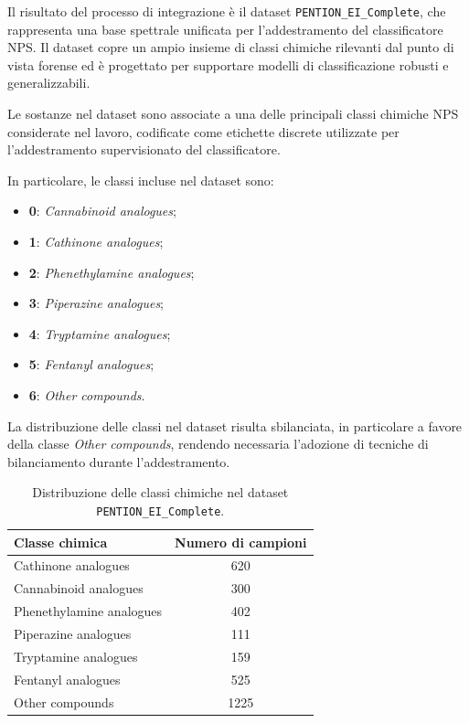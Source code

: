Il risultato del processo di integrazione è il dataset \texttt{PENTION\_EI\_Complete}, che rappresenta una base spettrale unificata per l’addestramento del classificatore NPS.
Il dataset copre un ampio insieme di classi chimiche rilevanti dal punto di vista forense ed è progettato per supportare modelli di classificazione robusti e generalizzabili.

Le sostanze nel dataset sono associate a una delle principali classi chimiche NPS considerate nel lavoro, codificate come etichette discrete utilizzate per l’addestramento supervisionato del classificatore.

In particolare, le classi incluse nel dataset sono:
\begin{itemize}
    \item \textbf{0}: \textit{Cannabinoid analogues};
    \item \textbf{1}: \textit{Cathinone analogues};
    \item \textbf{2}: \textit{Phenethylamine analogues};
    \item \textbf{3}: \textit{Piperazine analogues};
    \item \textbf{4}: \textit{Tryptamine analogues};
    \item \textbf{5}: \textit{Fentanyl analogues};
    \item \textbf{6}: \textit{Other compounds}.
\end{itemize}

La distribuzione delle classi nel dataset risulta sbilanciata, in particolare a favore della classe \textit{Other compounds}, rendendo necessaria l’adozione di tecniche di bilanciamento durante l’addestramento.

\begin{table}[H]
    \centering
    \small
    \begin{tabular}{lc}
        \toprule
        \textbf{Classe chimica}  & \textbf{Numero di campioni} \\
        \midrule
        Cathinone analogues      & 620                         \\
        Cannabinoid analogues    & 300                         \\
        Phenethylamine analogues & 402                         \\
        Piperazine analogues     & 111                         \\
        Tryptamine analogues     & 159                         \\
        Fentanyl analogues       & 525                         \\
        Other compounds          & 1225                        \\
        \bottomrule
    \end{tabular}
    \caption{Distribuzione delle classi chimiche nel dataset \texttt{PENTION\_EI\_Complete}.}
    \label{tab:dataset_class_distribution}
\end{table}

